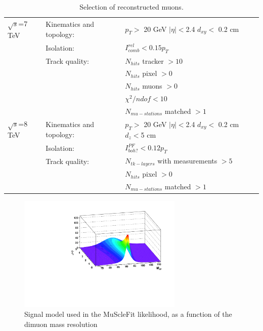 \begin{table}[hbH]
\begin{center}
\caption{Selection of reconstructed muons.\label{tab:muon_selection}}
\begin{tabular}{|l|ll|}
\hline
$\sqrt{s}$=7 TeV & Kinematics and topology:& $p_T>$ 20 GeV $|\eta|<$2.4 $d_{xy}<$ 0.2 cm \\
                 & Isolation: & $I^{rel}_{comb}<0.15 p_T$ \\
                 & Track quality: & $N_{hits}$  tracker $>10$ \\ && $N_{hits}$ pixel $>0$ \\&& $N_{hits}$ muons $>0$ \\&&  $\chi^2/ndof < 10$ \\
& & $N_{mu-stations}$ matched $>1$  \\
\hline
$\sqrt{s}$=8 TeV & Kinematics and topology:& $p_T>$ 20 GeV $|\eta|<$2.4 $d_{xy}<$ 0.2 cm $d_{z}<$5 cm \\
& Isolation: & $I^{PF}_{boh?}<0.12 p_T$ \\
& Track quality: & $N_{tk-layers}$ with measurements $>5$  \\ && $N_{hits}$ pixel $>0$\\
& & $N_{mu-stations}$ matched $>1$  \\
\hline
\end{tabular}
\end{center}
\end{table}

\begin{figure}[hbtp]  
\begin{center}
\includegraphics[width=0.7\textwidth]{figures/Lineshape_SURF2}
 \hspace{1cm} 
   \caption{Signal model used in the MuScleFit likelihood, as a function of the dimuon mass resolution
   \label{fig:lineshape}}
 \end{center}
\end{figure} 


